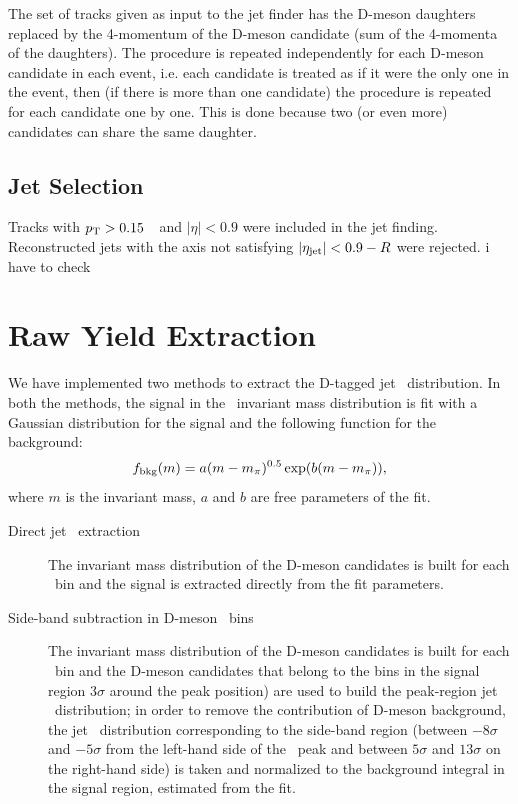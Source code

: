 The set of tracks given as input to the jet finder has the D-meson daughters replaced 
by the 4-momentum of the D-meson candidate (sum of the 4-momenta of the daughters).
The procedure is repeated independently for each D-meson candidate in each event, 
i.e. each candidate is treated as if it were the only one in the event, then (if there is more than one candidate) the procedure
is repeated for each candidate one by one.
This is done because two (or even more) candidates can share the same daughter. 

\subsection{Jet Selection}
Tracks with $p_{\rm T}>0.15$~\GeVc\ and $|\eta|<0.9$ were included in the jet finding. 
Reconstructed jets with the axis not satisfying $|\eta_{\mathrm{jet}}|<0.9-R$ were rejected.
{\color{red} i have to check}

\section{Raw Yield Extraction}
\label{sect:raw_yield}

We have implemented two methods to extract the D-tagged jet \pt\ distribution. 
In both the methods, the signal in the \Dstar\ invariant mass distribution is fit with a Gaussian distribution for the 
signal and the following function for the background:
\begin{equation}
\label{e_bkgDStar}
f_{\rm bkg} (m) = a (m-m_{\pi})^{0.5}\exp(b (m-m_{\pi})),
\end{equation}
where $m$ is the invariant mass, $a$ and $b$ are free parameters of the fit.
\begin{description}
\item[Direct jet \pt\ extraction] The invariant mass distribution of the D-meson candidates is built for each \ptchjet\ bin and the signal is extracted directly from the fit parameters.
\item[Side-band subtraction in D-meson \pt\ bins] The invariant mass distribution of the D-meson candidates is built for each \ptd\ bin and 
the D-meson candidates that belong to the bins in the signal region $3\sigma$ around the peak position) are used to build the peak-region jet \pt\ distribution;
in order to remove the contribution of D-meson background, the jet \pt\ distribution corresponding 
to the side-band region (between $-8\sigma$ and $-5\sigma$ from the left-hand side of the \Dstar\ peak and between $5\sigma$ and $13\sigma$ on the right-hand side) is taken and normalized to the background integral in the signal region, estimated from the fit.
\end{description}

